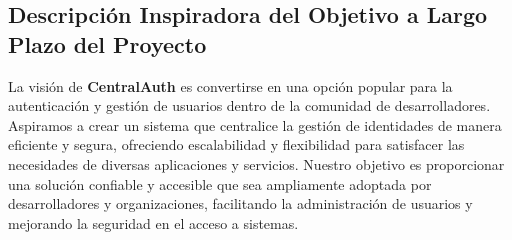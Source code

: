 \subsection{Descripción Inspiradora del Objetivo a Largo Plazo del Proyecto}

La visión de \textbf{CentralAuth} es convertirse en una opción popular para la autenticación y gestión de usuarios dentro de la comunidad de desarrolladores. Aspiramos a crear un sistema que centralice la gestión de identidades de manera eficiente y segura, ofreciendo escalabilidad y flexibilidad para satisfacer las necesidades de diversas aplicaciones y servicios. Nuestro objetivo es proporcionar una solución confiable y accesible que sea ampliamente adoptada por desarrolladores y organizaciones, facilitando la administración de usuarios y mejorando la seguridad en el acceso a sistemas.
